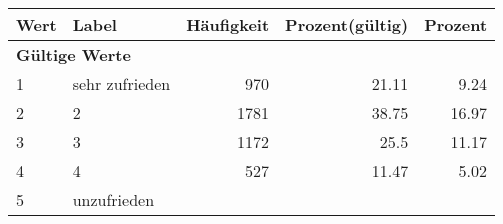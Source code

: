      \begin{longtable}{lXrrr}
     \toprule
     \textbf{Wert} & \textbf{Label} & \textbf{Häufigkeit} & \textbf{Prozent(gültig)} & \textbf{Prozent} \\
     \endhead
     \midrule
     \multicolumn{5}{l}{\textbf{Gültige Werte}}\\

     1 &
     \multicolumn{1}{X}{ sehr zufrieden   } &


       \num{970} &
       \num[round-mode=places,round-precision=2]{21.11} &
         \num[round-mode=places,round-precision=2]{9.24} \\

     2 &
     \multicolumn{1}{X}{ 2   } &


       \num{1781} &
       \num[round-mode=places,round-precision=2]{38.75} &
         \num[round-mode=places,round-precision=2]{16.97} \\

     3 &
     \multicolumn{1}{X}{ 3   } &


       \num{1172} &
       \num[round-mode=places,round-precision=2]{25.5} &
         \num[round-mode=places,round-precision=2]{11.17} \\

     4 &
     \multicolumn{1}{X}{ 4   } &


       \num{527} &
       \num[round-mode=places,round-precision=2]{11.47} &
         \num[round-mode=places,round-precision=2]{5.02} \\

     5 &
     \multicolumn{1}{X}{ unzufrieden   } &



\end{longtable}

